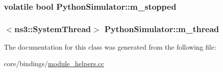 \subsubsection[{\texorpdfstring{m\+\_\+stopped}{m_stopped}}]{\setlength{\rightskip}{0pt plus 5cm}volatile bool Python\+Simulator\+::m\+\_\+stopped\hspace{0.3cm}{\ttfamily [private]}}\hypertarget{classPythonSimulator_a1f51fb844d75b932e6bb13af9889501e}{}\label{classPythonSimulator_a1f51fb844d75b932e6bb13af9889501e}
\subsubsection[{\texorpdfstring{m\+\_\+thread}{m_thread}}]{$<${\bf ns3\+::\+System\+Thread}$>$ Python\+Simulator\+::m\+\_\+thread\hspace{0.3cm}{\ttfamily [private]}}\hypertarget{classPythonSimulator_a142a11a2e7d6de41507bad5622265d7e}{}\label{classPythonSimulator_a142a11a2e7d6de41507bad5622265d7e}


The documentation for this class was generated from the following file\+:\begin{DoxyCompactItemize}
\item 
core/bindings/\hyperlink{module__helpers_8cc}{module\+\_\+helpers.\+cc}\end{DoxyCompactItemize}
